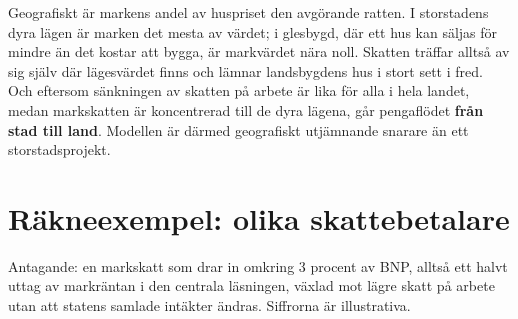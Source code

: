 \documentclass[11pt]{article}
\begin{document}
Geografiskt är markens andel av huspriset den avgörande ratten. I storstadens dyra lägen är marken det mesta av värdet; i glesbygd, där ett hus kan säljas för mindre än det kostar att bygga, är markvärdet nära noll. Skatten träffar alltså av sig själv där lägesvärdet finns och lämnar landsbygdens hus i stort sett i fred. Och eftersom sänkningen av skatten på arbete är lika för alla i hela landet, medan markskatten är koncentrerad till de dyra lägena, går pengaflödet \textbf{från stad till land}. Modellen är därmed geografiskt utjämnande snarare än ett storstadsprojekt.

\section{Räkneexempel: olika skattebetalare}

Antagande: en markskatt som drar in omkring 3 procent av BNP, alltså ett halvt uttag av markräntan i den centrala läsningen, växlad mot lägre skatt på arbete utan att statens samlade intäkter ändras. Siffrorna är illustrativa.
\end{document}
